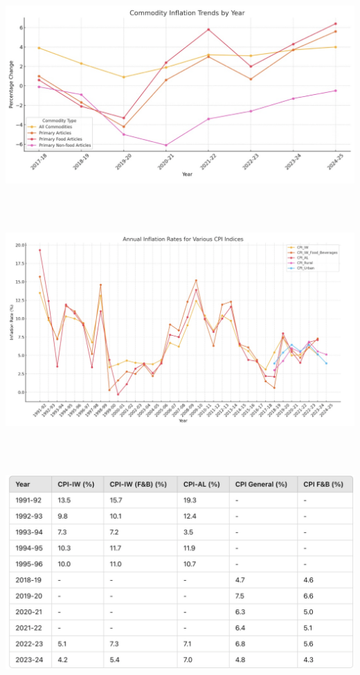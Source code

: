 \documentclass[a4paper,12pt]{extarticle} %
\begin{document}
\begin{center}
    \includegraphics[width=1\textwidth]{Q5/1.png} 
\end{center}\\
\\
\begin{center}
    \includegraphics[width=1\textwidth]{Q5/2.png} 
\end{center}\\
\\
\begin{center}
    \includegraphics[width=1\textwidth]{Q5/3.png} 
\end{center}\\
\end{document}
